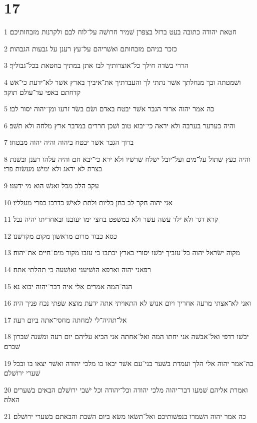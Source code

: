 \chapter{17}

\par 1 חטאת יהודה כתובה בעט ברזל בצפרן שׁמיר חרושׁה על־לוח לבם ולקרנות מזבחותיכם׃
\par 2 כזכר בניהם מזבחותם ואשׁריהם על־עץ רענן על גבעות הגבהות׃
\par 3 הררי בשׂדה חילך כל־אוצרותיך לבז אתן במתיך בחטאת בכל־גבוליך׃
\par 4 ושׁמטתה ובך מנחלתך אשׁר נתתי לך והעבדתיך את־איביך בארץ אשׁר לא־ידעת כי־אשׁ קדחתם באפי עד־עולם תוקד׃
\par 5 כה אמר יהוה ארור הגבר אשׁר יבטח באדם ושׂם בשׂר זרעו ומן־יהוה יסור לבו׃
\par 6 והיה כערער בערבה ולא יראה כי־יבוא טוב ושׁכן חררים במדבר ארץ מלחה ולא תשׁב׃
\par 7 ברוך הגבר אשׁר יבטח ביהוה והיה יהוה מבטחו׃
\par 8 והיה כעץ שׁתול על־מים ועל־יובל ישׁלח שׁרשׁיו ולא ירא כי־יבא חם והיה עלהו רענן ובשׁנת בצרת לא ידאג ולא ימישׁ מעשׂות פרי׃
\par 9 עקב הלב מכל ואנשׁ הוא מי ידענו׃
\par 10 אני יהוה חקר לב בחן כליות ולתת לאישׁ כדרכו כפרי מעלליו׃
\par 11 קרא דגר ולא ילד עשׂה עשׁר ולא במשׁפט בחצי ימו יעזבנו ובאחריתו יהיה נבל׃
\par 12 כסא כבוד מרום מראשׁון מקום מקדשׁנו׃
\par 13 מקוה ישׂראל יהוה כל־עזביך יבשׁו יסורי בארץ יכתבו כי עזבו מקור מים־חיים את־יהוה׃
\par 14 רפאני יהוה וארפא הושׁיעני ואושׁעה כי תהלתי אתה׃
\par 15 הנה־המה אמרים אלי איה דבר־יהוה יבוא נא׃
\par 16 ואני לא־אצתי מרעה אחריך ויום אנושׁ לא התאויתי אתה ידעת מוצא שׂפתי נכח פניך היה׃
\par 17 אל־תהיה־לי למחתה מחסי־אתה ביום רעה׃
\par 18 יבשׁו רדפי ואל־אבשׁה אני יחתו המה ואל־אחתה אני הביא עליהם יום רעה ומשׁנה שׁברון שׁברם׃
\par 19 כה־אמר יהוה אלי הלך ועמדת בשׁער בני־עם אשׁר יבאו בו מלכי יהודה ואשׁר יצאו בו ובכל שׁערי ירושׁלם׃
\par 20 ואמרת אליהם שׁמעו דבר־יהוה מלכי יהודה וכל־יהודה וכל ישׁבי ירושׁלם הבאים בשׁערים האלה׃
\par 21 כה אמר יהוה השׁמרו בנפשׁותיכם ואל־תשׂאו משׂא ביום השׁבת והבאתם בשׁערי ירושׁלם׃
